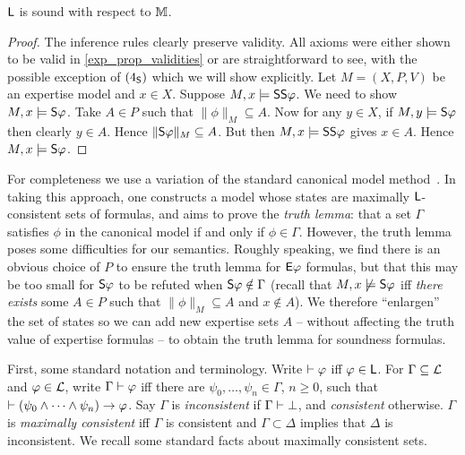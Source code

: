 \begin{theorem}
\label{exp_thm_soundness_m}
    $\sL$ is sound with respect to $\M$.
\end{theorem}

\begin{proof}
    The inference rules clearly preserve validity. All axioms were either shown to be
    valid in \cref{exp_prop_validities} or are straightforward to see, with the
    possible exception of $\foursoundness$ which we will show explicitly. Let
    $M = (X, P, V)$ be an expertise model and $x \in X$. Suppose $M, x \models
    \S\S\phi$. We need to show $M, x \models \S\phi$. Take $A \in P$ such that
    $\|\phi\|_M \subseteq A$. Now for any $y \in X$, if $M, y \models \S\phi$
    then clearly $y \in A$. Hence $\|\S\phi\|_M \subseteq A$. But then $M, x
    \models \S\S\phi$ gives $x \in A$. Hence $M, x \models \S\phi$.
\end{proof}

For completeness we use a variation of the standard canonical model
method~\cite[]{blackburn2002modal}.
In taking this approach, one constructs a model whose states are maximally
$\sL$-consistent sets of formulas, and aims to prove the \emph{truth lemma}:
that a set $\Gamma$ satisfies $\phi$ in the canonical model if and only if
$\phi \in \Gamma$. However, the truth lemma poses some difficulties for our
semantics. Roughly speaking, we find there is an obvious choice of $P$ to
ensure the truth lemma for $\E\phi$ formulas, but that this may be too small
for $\S\phi$ to be refuted when $\S\phi \notin \Gamma$ (recall that $M, x
\not\models \S\phi$ iff \emph{there exists} some $A \in P$ such that
$\|\phi\|_M \subseteq A$ and $x \notin A$). We therefore ``enlargen'' the set of
states so we can add new expertise sets $A$ -- without affecting the truth
value of expertise formulas -- to obtain the truth lemma for soundness
formulas.

First, some standard notation and terminology. Write $\thm \phi$ iff
$\phi \in \sL$. For $\Gamma \subseteq \cL$ and $\phi \in \cL$, write $\Gamma
\thm \phi$ iff there are $\psi_0, \ldots, \psi_n \in \Gamma$, $n \ge 0$, such
that $\thm (\psi_0 \land \cdots \land \psi_n) \limplies \phi$.  Say $\Gamma$
is \emph{inconsistent} if $\Gamma \entails \bot$, and
\emph{consistent} otherwise. $\Gamma$ is \emph{maximally
consistent} iff $\Gamma$ is consistent and $\Gamma \subset \Delta$ implies that
$\Delta$ is inconsistent. We recall some standard facts about maximally
consistent sets.

